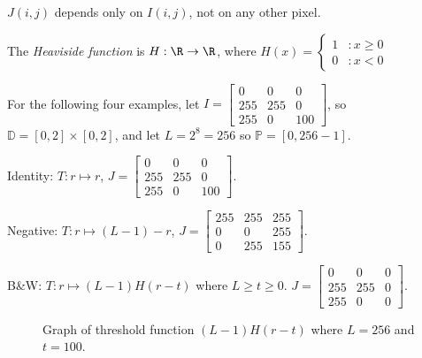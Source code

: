 \documentclass[12pt]{article}
\begin{document}
\begin{rmk}
    $J(i, j)$ depends only on $I(i, j)$, not on any other pixel.
\end{rmk}

\begin{defn}
    The \emph{Heaviside function} is $H: \R \to \R$, where $H(x) = \left\{
    \begin{array}{lr}
        1 & : x \geq 0 \\
        0 & : x < 0
    \end{array}\right.$
\end{defn}

For the following four examples, let $I = \begin{bmatrix}
    0 & 0 & 0\\ 255 & 255 & 0 \\ 255 & 0 & 100
\end{bmatrix}$, so $\mathbb{D} = \left[0, 2\right] \times \left[0, 2\right]$, and let $L = 2^8 = 256$ so $\mathbb{P} = \left[0, 256 - 1\right]$.

\begin{exmp}
    Identity: $T: r \mapsto r$, $J = \begin{bmatrix}
        0 & 0 & 0\\ 255 & 255 & 0 \\ 255 & 0 & 100
    \end{bmatrix}$.
\end{exmp}

\begin{exmp}
    Negative: $T: r \mapsto (L-1) - r$, $J = \begin{bmatrix}
        255 & 255 & 255 \\ 0 & 0 & 255 \\ 0 & 255 & 155
    \end{bmatrix}$.
\end{exmp}

\begin{exmp}
    B\&W: $T: r \mapsto (L-1)H(r - t)$ where $L \geq t \geq 0$. $J = \begin{bmatrix}
        0 & 0 & 0\\ 255 & 255 & 0 \\ 255 & 0 & 0
    \end{bmatrix}$.
\end{exmp}

\begin{figure}[ht!]
    \centering
\caption{Graph of threshold function $(L-1)H(r - t)$ where $L = 256$ and $t = 100$.}
\label{fig:threshold}
\end{figure}
\end{document}
